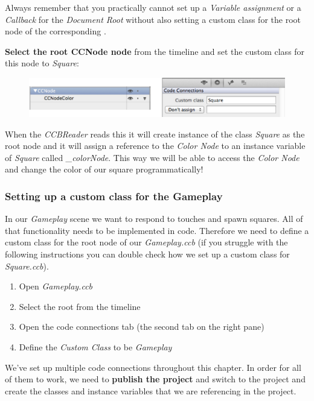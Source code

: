 \begin{lamp}[frametitle={Variable Assignments, Callbacks and Custom Classes}] 
Always remember that you practically cannot set up a \textit{Variable
assignment} or a \textit{Callback} for the \textit{Document Root} without also
setting a custom class for the root node of the corresponding \ccbfile{}. %
\end{lamp}

\textbf{Select the root CCNode node} from the timeline and set the custom class
for this node to \textit{Square}:
\begin{figure}[H]
		\centering
		\includegraphics[width=350pt]{images/firstproject/square_custom_class.png}
\end{figure}
When the \textit{CCBReader} reads this \ccbfile{} it will create instance of the
class \textit{Square} as the root node and it will assign a reference to the
\textit{Color Node} to an instance variable of \textit{Square} called
\textit{\_colorNode}. This way we will be able to access the \textit{Color Node}
and change the color of our square programmatically!

\subsubsection{Setting up a custom class for the Gameplay}
In our \textit{Gameplay} scene we want to respond to touches and spawn squares.
All of that functionality needs to be implemented in code. Therefore we need to
define a custom class for the root node of our \textit{Gameplay.ccb} (if you
struggle with the following instructions you can double check how we set up a
custom class for \textit{Square.ccb}).

\begin{enumerate}
  \item Open \textit{Gameplay.ccb}
  \item Select the root \ccnode{} from the timeline
  \item Open the code connections tab (the second tab on the right pane)
  \item Define the \textit{Custom Class} to be \textit{Gameplay}
\end{enumerate}

We've set up multiple code connections throughout this chapter. In order for all
of them to work, we need to \textbf{publish the \SB{} project} and switch to the
\xcode{} project and create the classes and instance variables that we are referencing in the \SB{} project.

